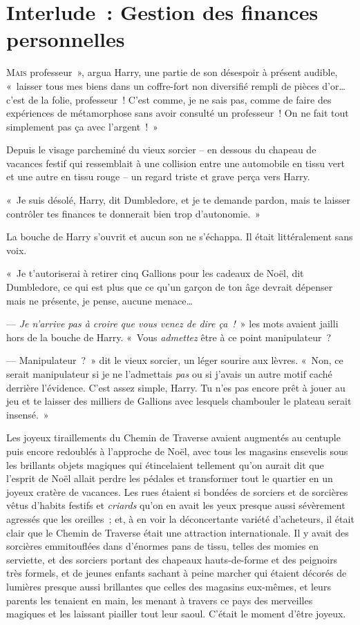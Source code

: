 \chapter{Interlude~: Gestion des finances personnelles}

\lettrine[ante=«~]{M}{ais} professeur~», argua Harry, une partie de son désespoir à présent audible, «~laisser tous mes biens dans un coffre-fort non diversifié rempli de pièces d'or… c'est de la folie, professeur~!
C'est comme, je ne sais pas, comme de faire des expériences de métamorphose sans avoir consulté un professeur~!
On ne fait tout simplement pas ça avec l'argent~!~»

Depuis le visage parcheminé du vieux sorcier -- en dessous du chapeau de vacances festif qui ressemblait à une collision entre une automobile en tissu vert et une autre en tissu rouge -- un regard triste et grave perça vers Harry.

«~Je suis désolé, Harry, dit Dumbledore, et je te demande pardon, mais te laisser contrôler tes finances te donnerait bien trop d'autonomie.~»

La bouche de Harry s'ouvrit et aucun son ne s'échappa.
Il était littéralement sans voix.

«~Je t'autoriserai à retirer cinq Gallions pour les cadeaux de Noël, dit Dumbledore, ce qui est plus que ce qu'un garçon de ton âge devrait dépenser mais ne présente, je pense, aucune menace…

--- \emph{Je n'arrive pas à croire que vous venez de dire ça~!}~» les mots avaient jailli hors de la bouche de Harry.
«~Vous \emph{admettez} être à ce point manipulateur~?

--- Manipulateur~?~»
dit le vieux sorcier, un léger sourire aux lèvres.
«~Non, ce serait manipulateur si je ne l'admettais \emph{pas} ou si j'avais un autre motif caché derrière l'évidence.
C'est assez simple, Harry.
Tu n'es pas encore prêt à jouer au jeu et te laisser des milliers de Gallions avec lesquels chambouler le plateau serait insensé.~»

\later

Les joyeux tiraillements du Chemin de Traverse avaient augmentés au centuple puis encore redoublés à l'approche de Noël, avec tous les magasins ensevelis sous les brillants objets magiques qui étincelaient tellement qu'on aurait dit que l'esprit de Noël allait perdre les pédales et transformer tout le quartier en un joyeux cratère de vacances.
Les rues étaient si bondées de sorciers et de sorcières vêtus d'habits festifs et \emph{criards} qu'on en avait les yeux presque aussi sévèrement agressés que les oreilles~; et, à en voir la déconcertante variété d'acheteurs, il était clair que le Chemin de Traverse était une attraction internationale.
Il y avait des sorcières emmitouflées dans d'énormes pans de tissu, telles des momies en serviette, et des sorciers portant des chapeaux hauts-de-forme et des peignoirs très formels, et de jeunes enfants sachant à peine marcher qui étaient décorés de lumières presque aussi brillantes que celles des magasins eux-mêmes, et leurs parents les tenaient en main, les menant à travers ce pays des merveilles magiques et les laissant piailler tout leur saoul.
C'était le moment d'être joyeux.

